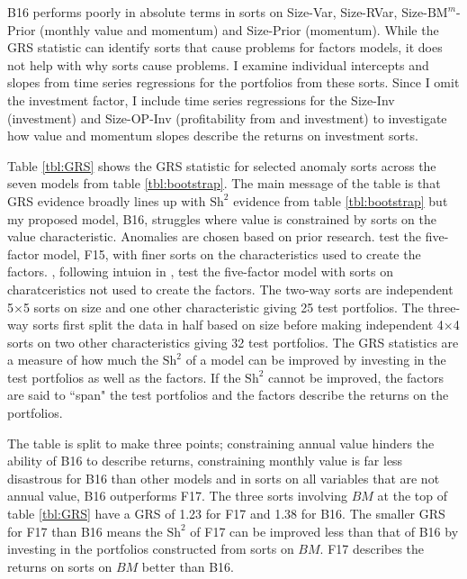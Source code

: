 
B16 performs poorly in absolute terms in sorts on Size-Var, Size-RVar,
Size-$\text{BM}^m$-Prior (monthly value and momentum) and Size-Prior (momentum). While the
GRS statistic can identify sorts that cause problems for factors models, it does not help
with why sorts cause problems. I examine individual intercepts and slopes from time series
regressions for the portfolios from these sorts. Since I omit the investment factor, I
include time series regressions for the Size-Inv (investment) and Size-OP-Inv
(profitability from \textcite{fama2006profitability} and investment) to investigate how
value and momentum slopes describe the returns on investment sorts.

Table \ref{tbl:GRS} shows the GRS statistic for selected anomaly sorts across
the seven models from table \ref{tbl:bootstrap}.
The main message of the table is that GRS evidence broadly lines up with
$\text{Sh}^2$ evidence from table \ref{tbl:bootstrap} but my proposed model,
B16, struggles where value is constrained by sorts on the value characteristic.
Anomalies are chosen based on prior research.
\textcite{fama2015five} test the five-factor model, F15, with finer sorts on
the characteristics used to create the factors.
\textcite{fama2016dissecting}, following intuion in
\textcite{lewellen2010skeptical}, test the five-factor model with sorts on
charatceristics not used to create the factors.
The two-way sorts are independent 5$\times$5 sorts on size and one other
characteristic giving 25 test portfolios.
The three-way sorts first split the data in half based on size before making
independent 4$\times$4 sorts on two other characteristics giving 32 test
portfolios.
The GRS statistics are a measure of how much the $\text{Sh}^2$ of a model can
be improved by investing in the test portfolios as well as the factors.
If the $\text{Sh}^2$ cannot be improved, the factors are said to ``span" the
test portfolios and the factors describe the returns on the portfolios.

The table is split to make three points;
constraining annual value hinders the ability of B16 to describe returns,
constraining monthly value is far less disastrous for B16 than other models and
in sorts on all variables that are not annual value, B16 outperforms F17.
The three sorts involving $BM$ at the top of table \ref{tbl:GRS} have a GRS of
1.23 for F17 and 1.38 for B16.
The smaller GRS for F17 than B16 means the $\text{Sh}^2$ of F17 can be improved
less than that of B16 by investing in the portfolios constructed from sorts on
$BM$.
F17 describes the returns on sorts on $BM$ better than B16.

